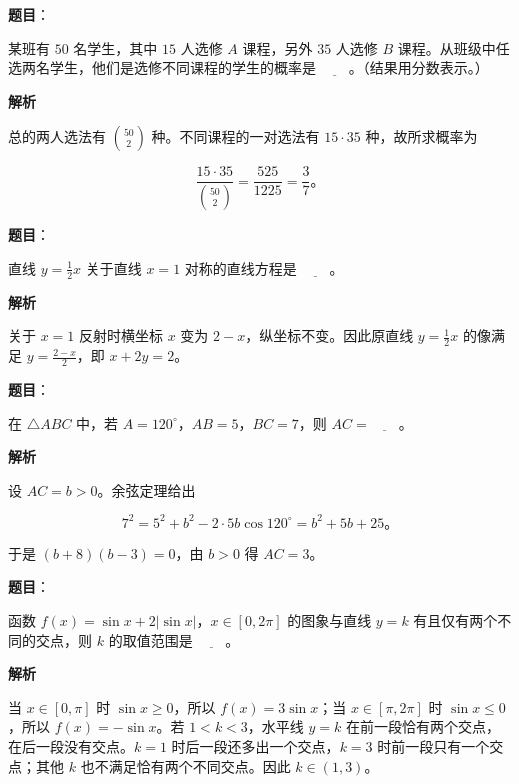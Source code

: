 \begin{answer}

\textbf{题目}：

某班有 $50$ 名学生，其中 $15$ 人选修 $A$ 课程，另外 $35$ 人选修 $B$ 课程。从班级中任选两名学生，他们是选修不同课程的学生的概率是 $\underline{\qquad}$。（结果用分数表示。）

\textbf{解析}

总的两人选法有 $\binom{50}{2}$ 种。不同课程的一对选法有 $15\cdot35$ 种，故所求概率为

\nopagebreak[4]
\[
\frac{15\cdot35}{\binom{50}{2}}=\frac{525}{1225}=\frac37\mbox{。}
\]


\end{answer}
\begin{answer}

\textbf{题目}：

直线 $y=\frac12x$ 关于直线 $x=1$ 对称的直线方程是 $\underline{\qquad}$。

\textbf{解析}

关于 $x=1$ 反射时横坐标 $x$ 变为 $2-x$，纵坐标不变。因此原直线 $y=\frac12x$ 的像满足 $y=\frac{2-x}{2}$，即 $x+2y=2$。


\end{answer}
\begin{answer}

\textbf{题目}：

在 $\triangle ABC$ 中，若 $A=120^\circ$，$AB=5$，$BC=7$，则 $AC=\underline{\qquad}$。

\textbf{解析}

设 $AC=b>0$。余弦定理给出

\nopagebreak[4]
\[
7^2=5^2+b^2-2\cdot5b\cos120^\circ=b^2+5b+25\mbox{。}
\]

于是 $(b+8)(b-3)=0$，由 $b>0$ 得 $AC=3$。


\end{answer}
\begin{answer}

\textbf{题目}：

函数 $f(x)=\sin x+2|\sin x|$，$x\in[0,2\pi]$ 的图象与直线 $y=k$ 有且仅有两个不同的交点，则 $k$ 的取值范围是 $\underline{\qquad}$。

\textbf{解析}

当 $x\in[0,\pi]$ 时 $\sin x\ge0$，所以 $f(x)=3\sin x$；当 $x\in[\pi,2\pi]$ 时 $\sin x\le0$，所以 $f(x)=-\sin x$。若 $1<k<3$，水平线 $y=k$ 在前一段恰有两个交点，在后一段没有交点。$k=1$ 时后一段还多出一个交点，$k=3$ 时前一段只有一个交点；其他 $k$ 也不满足恰有两个不同交点。因此 $k\in(1,3)$。


\end{answer}
